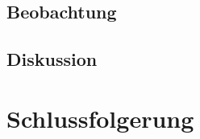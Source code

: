 \documentclass[
	a4paper,
	12pt,
	pagesize,
	ngerman
]{scrartcl}
\begin{document}
	\subsection{Beobachtung}

	\subsection{Diskussion}
	
	\section{Schlussfolgerung}
	
\end{document}

